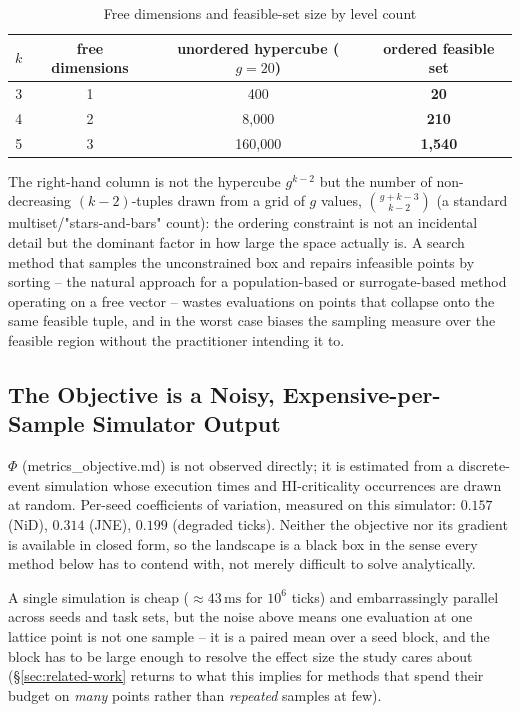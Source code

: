 \begin{table}[h]
\centering
\caption{Free dimensions and feasible-set size by level count}
\begin{tabular}{cccc}
\toprule
$k$ & free dimensions & unordered hypercube ($g=20$) & ordered feasible set \\
\midrule
3 & 1 & 400 & \textbf{20} \\
4 & 2 & 8{,}000 & \textbf{210} \\
5 & 3 & 160{,}000 & \textbf{1{,}540} \\
\bottomrule
\end{tabular}
\end{table}

\noindent The right-hand column is not the hypercube $g^{k-2}$ but the number
of non-decreasing $(k{-}2)$-tuples drawn from a grid of $g$ values,
$\binom{g+k-3}{k-2}$ (a standard multiset/"stars-and-bars" count): the ordering
constraint is not an incidental detail but the dominant factor in how large
the space actually is. A search method that samples the unconstrained box and
repairs infeasible points by sorting -- the natural approach for a
population-based or surrogate-based method operating on a free vector --
wastes evaluations on points that collapse onto the same feasible tuple, and
in the worst case biases the sampling measure over the feasible region without
the practitioner intending it to.

\subsection{The Objective is a Noisy, Expensive-per-Sample Simulator Output}

$\Phi$ (metrics\_objective.md) is not observed directly; it is estimated from
a discrete-event simulation whose execution times and HI-criticality
occurrences are drawn at random. Per-seed coefficients of variation, measured
on this simulator: $0.157$ (NiD), $0.314$ (JNE), $0.199$ (degraded ticks).
Neither the objective nor its gradient is available in closed form, so the
landscape is a black box in the sense every method below has to contend with,
not merely difficult to solve analytically.

A single simulation is cheap ($\approx 43\,\mathrm{ms}$ for $10^6$ ticks) and
embarrassingly parallel across seeds and task sets, but the noise above means
one evaluation at one lattice point is not one sample -- it is a paired mean
over a seed block, and the block has to be large enough to resolve the effect
size the study cares about (\S\ref{sec:related-work} returns to what this
implies for methods that spend their budget on \emph{many} points rather than
\emph{repeated} samples at few).

